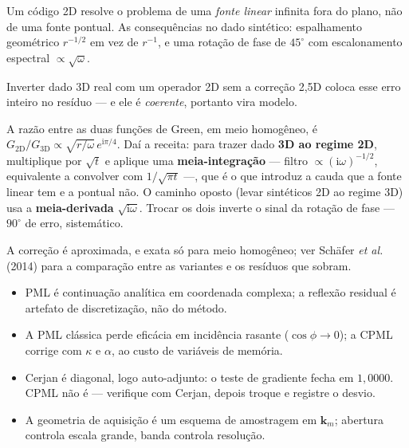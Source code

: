 \documentclass[11pt,a4paper,oneside]{report}
\begin{document}
\begin{atencao}
Um c\'odigo 2D resolve o problema de uma \emph{fonte linear} infinita fora do
plano, n\~ao de uma fonte pontual. As consequ\^encias no dado sint\'etico:
espalhamento geom\'etrico $r^{-1/2}$ em vez de $r^{-1}$, e uma
rota\c{c}\~ao de fase de $45^\circ$ com escalonamento espectral
$\propto\sqrt{\omega}$.

Inverter dado 3D real com um operador 2D sem a corre\c{c}\~ao 2{,}5D coloca
esse erro inteiro no res\'iduo --- e ele \'e \emph{coerente}, portanto vira
modelo.

A raz\~ao entre as duas fun\c{c}\~oes de Green, em meio homog\^eneo, \'e
$G_{2\mathrm{D}}/G_{3\mathrm{D}} \propto \sqrt{r/\omega}\,e^{\mathrm{i}\pi/4}$.
Da\'i a receita: para trazer dado \textbf{3D ao regime 2D}, multiplique por
$\sqrt{t}$ e aplique uma \textbf{meia-integra\c{c}\~ao} --- filtro
$\propto(\mathrm{i}\omega)^{-1/2}$, equivalente a convolver com
$1/\sqrt{\pi t}$ ---, que \'e o que introduz a cauda que a fonte linear tem e a
pontual n\~ao. O caminho oposto (levar sint\'eticos 2D ao regime 3D) usa a
\textbf{meia-derivada} $\sqrt{\mathrm{i}\omega}$. Trocar os dois inverte o
sinal da rota\c{c}\~ao de fase --- $90^\circ$ de erro, sistem\'atico.

A corre\c{c}\~ao \'e aproximada, e exata s\'o para meio homog\^eneo; ver
Sch\"afer \emph{et al.} (2014) para a compara\c{c}\~ao entre as variantes e os
res\'iduos que sobram.
\end{atencao}

\begin{resumo}
\begin{itemize}[leftmargin=*, itemsep=1pt]
\item PML \'e continua\c{c}\~ao anal\'itica em coordenada complexa; a
reflex\~ao residual \'e artefato de discretiza\c{c}\~ao, n\~ao do m\'etodo.
\item A PML cl\'assica perde efic\'acia em incid\^encia rasante ($\cos\phi\to0$);
a CPML corrige com $\kappa$ e $\alpha$, ao custo de vari\'aveis de mem\'oria.
\item Cerjan \'e diagonal, logo auto-adjunto: o teste de gradiente fecha em
$1{,}0000$. CPML n\~ao \'e --- verifique com Cerjan, depois troque e registre o
desvio.
\item A geometria de aquisi\c{c}\~ao \'e um esquema de amostragem em
$\mathbf{k}_m$; abertura controla escala grande, banda controla resolu\c{c}\~ao.
\end{itemize}
\end{resumo}
\end{document}

